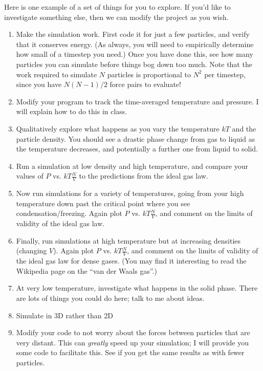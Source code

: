 \documentclass[12pt]{article}
\begin{document}
Here is one example of a set of things for you to explore. If you'd like to investigate something else, then we can modify the project as you wish.

\begin{enumerate}
  \item{Make the simulation work. First code it for just a few particles, and verify that it conserves energy. (As always, you will need to empirically determine how small of a timestep you need.) Once you have done this, see how many particles you can simulate before things bog down too much. Note that the work required to simulate $N$ 
    particles is proportional to $N^2$ per timestep, since you have $N(N-1)/2$ force pairs to evaluate!}

  \item{Modify your program to track the time-averaged temperature and pressure. I will explain how to do this in class.}

  \item{Qualitatively explore what happens as you vary the temperature $kT$ and the particle density. You should see a drastic phase change from gas to liquid as the temperature decreases, and potentially a further one from liquid to solid.}

  \item{Run a simulation at low density and high temperature, and compare your values of $P$ vs. $kT \frac{N}{V}$ to the predictions from the ideal gas law.}
  
  \item{Now run simulations for a variety of temperatures, going from your high temperature down past the critical point where you see condensation/freezing. Again plot $P$ vs. $kT \frac{N}{V}$, and comment on the limits of validity of the ideal gas law.}

  \item{Finally, run simulations at high temperature but at increasing densities (changing $V$). Again plot $P$ vs. $kT \frac{N}{V}$, and comment on the limits of validity of the ideal gas law for dense gases. (You may find it interesting to read the Wikipedia page on the ``van der Waals gas''.)}

  \item{At very low temperature, investigate what happens in the solid phase. There are lots of things you could do here; talk to me about ideas.}

  \item{Simulate in 3D rather than 2D}

  \item{Modify your code to not worry about the forces between particles that are very distant. This can {\it greatly} speed up your simulation; I will provide you some code to facilitate this. See if you get the same results as with fewer particles.}

\end{enumerate}
\end{document}
